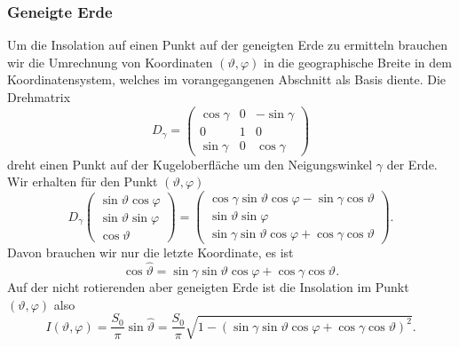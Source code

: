 \subsubsection{Geneigte Erde}
Um die Insolation auf einen Punkt auf der geneigten Erde zu ermitteln
brauchen wir die Umrechnung von Koordinaten $(\vartheta,\varphi)$ 
in die geographische Breite in dem Koordinatensystem, welches im
vorangegangenen Abschnitt als Basis diente.
Die Drehmatrix
\[
D_\gamma
=
\begin{pmatrix}
\cos\gamma&0&-\sin\gamma\\
0&1&0\\
\sin\gamma&0&\cos\gamma
\end{pmatrix}
\]
dreht einen Punkt auf der Kugeloberfläche um den Neigungswinkel
$\gamma$ der Erde.
Wir erhalten für den Punkt $(\vartheta,\varphi)$
\[
D_\gamma\begin{pmatrix}
\sin\vartheta\cos\varphi\\
\sin\vartheta\sin\varphi\\
\cos\vartheta
\end{pmatrix}
=
\begin{pmatrix}
\cos\gamma\sin\vartheta\cos\varphi -\sin\gamma\cos\vartheta\\
\sin\vartheta\sin\varphi\\
\sin\gamma\sin\vartheta\cos\varphi + \cos\gamma\cos\vartheta
\end{pmatrix}.
\]
Davon brauchen wir nur die letzte Koordinate, es ist
\begin{equation}
\cos\hat\vartheta
=
\sin\gamma\sin\vartheta\cos\varphi+\cos\gamma\cos\vartheta.
\end{equation}
Auf der nicht rotierenden aber geneigten Erde ist die Insolation
im Punkt $(\vartheta,\varphi)$ also
\begin{equation}
I(\vartheta,\varphi)
=
\frac{S_0}{\pi}
\sin\hat\vartheta
=
\frac{S_0}{\pi}
\sqrt{1-
(\sin\gamma\sin\vartheta\cos\varphi+\cos\gamma\cos\vartheta)^2}.
\label{skript:chapter:inspunkt}
\end{equation}

